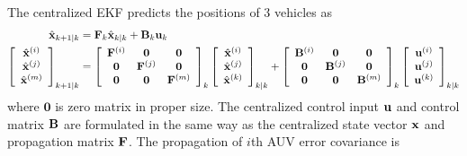 The centralized EKF predicts the positions of 3 vehicles as
\begin{align}
\begin{split}
          {\hat{\bf x}}_{k+1|k}&={\bf F}_{k}{\hat{\bf x}}_{k|k}+{\bf B}_{k}{\bf u}_{k} \\
\left[\begin{array}{c}
                {\hat{\bf x}}^{(i)}\\
                {\hat{\bf x}}^{(j)}\\
                {\hat{\bf x}}^{(m)}\\
              \end{array}
            \right]_{k+1|k}&=\left[
              \begin{array}{ccc}
                {\bf F}^{(i)} & \mathbf{0} & \mathbf{0} \\
                \mathbf{0} & {\bf F}^{(j)} & \mathbf{0}\\
                \mathbf{0} & \mathbf{0} & {\bf F}^{(m)}\\
              \end{array}
            \right]_{k}\left[\begin{array}{c}
                {\hat{\bf x}}^{(i)}\\
                {\hat{\bf x}}^{(j)}\\
                {\hat{\bf x}}^{(k)}\\
              \end{array}
            \right]_{k|k}+\left[
              \begin{array}{ccc}
                {\bf B}^{(i)} & \mathbf{0} & \mathbf{0} \\
                \mathbf{0} & {\bf B}^{(j)} & \mathbf{0}\\
                \mathbf{0} & \mathbf{0} & {\bf B}^{(m)}\\
              \end{array}
            \right]_{k}\left[\begin{array}{c}
                {{\bf u}}^{(i)}\\
                {{\bf u}}^{(j)}\\
                {{\bf u}}^{(k)}\\
              \end{array}
            \right]_{k|k}\\
\end{split}
\end{align}
where $\mathbf 0$ is zero matrix in proper size. The centralized control input $\bf u$ and control matrix $\bf B$ are formulated in the same way as the centralized state vector ${\bf x}$ and propagation matrix $\bf F$. The propagation of $i$th AUV error covariance is
